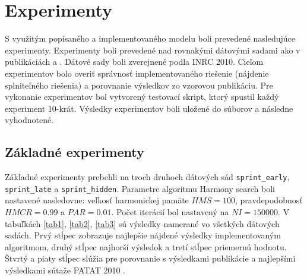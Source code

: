 \documentclass[a4paper, 14pt]{article}
\begin{document}
\section{Experimenty}
S využitým popísaného a implementovaného modelu boli prevedené nasledujúce experimenty. Experimenty boli prevedené nad rovnakými dátovými sadami ako v publikáciách \cite{MainArticle} a \cite{MathArticle}. Dátové sady boli zverejnené podla INRC 2010. Cieľom experimentov bolo overiť správnosť implementovaného riešenie (nájdenie splniteľného riešenia) a porovnanie výsledkov zo vzorovou publikáciu. Pre vykonanie experimentov bol vytvorený testovací skript, ktorý spustil každý experiment 10-krát. Výsledky experimentov boli uložené do súborov a následne vyhodnotené. 

\subsection{Základné experimenty}
Základné experimenty prebehli na troch druhoch dátových sád \texttt{sprint\_early}, \texttt{sprint\_late} a \texttt{sprint\_hidden}. Parametre algoritmu Harmony search boli nastavené nasledovne: veľkosť harmonickej pamäte $HMS = 100$, pravdepodobnosť  $HMCR = 0.99$ a $PAR = 0.01$. Počet iterácií bol nastavený na $NI = 150000$. V tabuľkách \ref{tab1}, \ref{tab2}, \ref{tab3} sú výsledky namerané vo všetkých dátových sadách. Prvý stĺpec zobrazuje najlepšie nájdené výsledky implementovaným algoritmom, druhý stĺpec najhorší výsledok a tretí stĺpec priemernú hodnotu. Štvrtý a piaty stĺpec slúžia pre porovnanie s výsledkami publikácie a najlepšími výsledkami sútaže PATAT 2010 \cite{PATAT}. 
\end{document}
